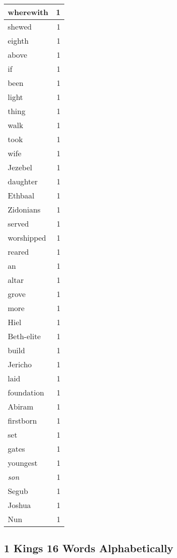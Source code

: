 \begin{center}
\begin{longtable}{l|r}
wherewith & 1\\ \hline 
shewed & 1\\ \hline 
eighth & 1\\ \hline 
above & 1\\ \hline 
if & 1\\ \hline 
been & 1\\ \hline 
light & 1\\ \hline 
thing & 1\\ \hline 
walk & 1\\ \hline 
took & 1\\ \hline 
wife & 1\\ \hline 
Jezebel & 1\\ \hline 
daughter & 1\\ \hline 
Ethbaal & 1\\ \hline 
Zidonians & 1\\ \hline 
served & 1\\ \hline 
worshipped & 1\\ \hline 
reared & 1\\ \hline 
an & 1\\ \hline 
altar & 1\\ \hline 
grove & 1\\ \hline 
more & 1\\ \hline 
Hiel & 1\\ \hline 
Beth-elite & 1\\ \hline 
build & 1\\ \hline 
Jericho & 1\\ \hline 
laid & 1\\ \hline 
foundation & 1\\ \hline 
Abiram & 1\\ \hline 
firstborn & 1\\ \hline 
set & 1\\ \hline 
gates & 1\\ \hline 
youngest & 1\\ \hline 
\emph{son} & 1\\ \hline 
Segub & 1\\ \hline 
Joshua & 1\\ \hline 
Nun & 1\\ \hline 
\end{longtable}
\end{center}





\subsection{1 Kings 16 Words Alphabetically}


